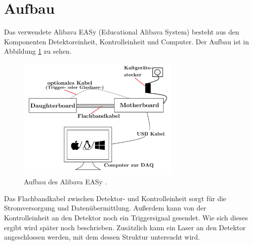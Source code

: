 \section{Aufbau}

Das verwendete Alibava EASy (Educational Alibava System) besteht aus den Komponenten Detektoreinheit, Kontrolleinheit und Computer.
Der Aufbau ist in Abbildung \ref{fig:aufbau} zu sehen.
\begin{figure}
  \centering
  \includegraphics[height=6cm]{TimosAufrisse/aufbau.png}
  \caption{Aufbau des Alibava EASy \cite{anleitung}.}
  \label{fig:aufbau}
\end{figure}
Das Flachbandkabel zwischen Detektor- und Kontrolleinheit sorgt für die Stromversorgung und Datenübermittlung. Außerdem kann von der Kontrolleinheit an den Detektor noch ein Triggersignal gesendet. Wie sich dieses ergibt wird später noch beschrieben. Zusätzlich kann ein Laser an den Detektor angeschlossen werden, mit dem dessen Struktur untersucht wird.

